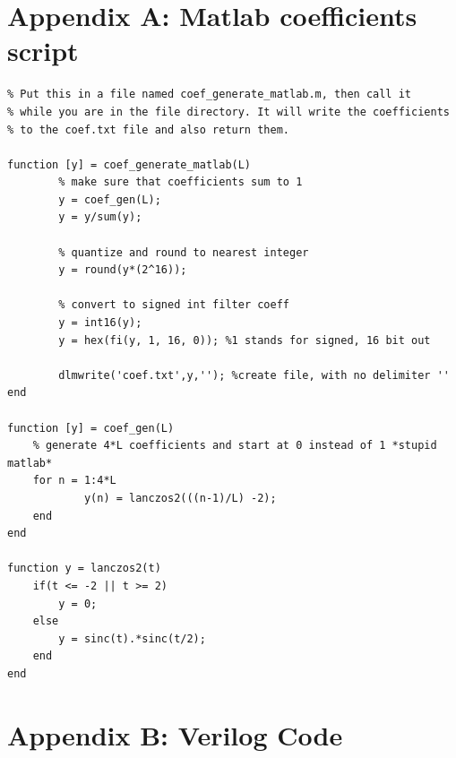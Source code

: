 \documentclass[a4paper,twoside,11pt, fleqn]{article}
\begin{document}
\newpage
\section{Appendix A: Matlab coefficients script}
\begin{lstlisting}
% Put this in a file named coef_generate_matlab.m, then call it 
% while you are in the file directory. It will write the coefficients
% to the coef.txt file and also return them.

function [y] = coef_generate_matlab(L)
        % make sure that coefficients sum to 1
        y = coef_gen(L);
        y = y/sum(y);

        % quantize and round to nearest integer
        y = round(y*(2^16)); 
             
        % convert to signed int filter coeff
        y = int16(y);
        y = hex(fi(y, 1, 16, 0)); %1 stands for signed, 16 bit out
        
        dlmwrite('coef.txt',y,''); %create file, with no delimiter ''      
end

function [y] = coef_gen(L)
    % generate 4*L coefficients and start at 0 instead of 1 *stupid matlab*
    for n = 1:4*L
            y(n) = lanczos2(((n-1)/L) -2);
    end
end

function y = lanczos2(t)
    if(t <= -2 || t >= 2)
        y = 0;
    else
        y = sinc(t).*sinc(t/2);
    end
end

\end{lstlisting}

\newpage
\section{Appendix B: Verilog Code}
\end{document}
